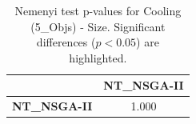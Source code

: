 \begin{table}[h!]
\centering
\scriptsize
\begin{tabular}{lc}
\toprule
 & NT\_NSGA-II \\
\midrule
\textbf{NT\_NSGA-II} & 1.000 \\
\bottomrule
\end{tabular}
\caption{Nemenyi test p-values for Cooling (5_Objs) - Size. Significant differences ($p < 0.05$) are highlighted.}
\label{tab:nemenyi_nemenyi_Cooling_5_Objs_Test_Size}
\end{table}